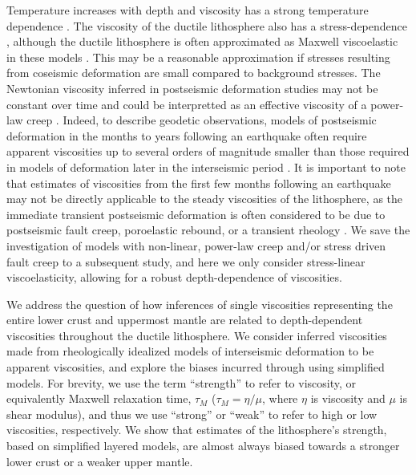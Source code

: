 Temperature increases with depth and viscosity has a strong
temperature dependence \citep[e.g.,][]{Kohlstedt1995}.  The viscosity
of the ductile lithosphere also has a stress-dependence
\citep[e.g.,][]{Kohlstedt1995}, although the ductile lithosphere is
often approximated as Maxwell viscoelastic in these models
\citep[e.g.,][]{Hetland2003, Johnson2007, Riva2009, Yamasaki2012a}.
This may be a reasonable approximation if stresses resulting from
coseismic deformation are small compared to background stresses.  The
Newtonian viscosity inferred in postseismic deformation studies may
not be constant over time and could be interpretted as an effective
viscosity of a power-law creep \citep[e.g.,][]{Freed2006b}. Indeed, to
describe geodetic observations, models of postseismic deformation in
the months to years following an earthquake often require apparent
viscosities up to several orders of magnitude smaller than those
required in models of deformation later in the interseismic period
\citep[e.g.,][]{Pollitz2005,Johnson2007,Meade2013}. It is important to
note that estimates of viscosities from the first few months following
an earthquake may not be directly applicable to the steady viscosities
of the lithosphere, as the immediate transient postseismic deformation
is often considered to be due to postseismic fault creep, poroelastic
rebound, or a transient rheology \citep[e.g.,][]{Pollitz2003,
Freed2006b, Hearn2009}. We save the investigation of models with
non-linear, power-law creep and/or stress driven fault creep to a
subsequent study, and here we only consider stress-linear
viscoelasticity, allowing for a robust depth-dependence of
viscosities.

We address the question of how inferences of single viscosities
representing the entire lower crust and uppermost mantle are related
to depth-dependent viscosities throughout the ductile lithosphere. We
consider inferred viscosities made from rheologically idealized models
of interseismic deformation to be apparent viscosities, and explore
the biases incurred through using simplified models. For brevity, we
use the term ``strength'' to refer to viscosity, or equivalently
Maxwell relaxation time, $\tau_M$ ($\tau_M = \eta/\mu$, where $\eta$
is viscosity and $\mu$ is shear modulus), and thus we use ``strong''
or ``weak'' to refer to high or low viscosities, respectively. We show
that estimates of the lithosphere's strength, based on simplified
layered models, are almost always biased towards a stronger lower
crust or a weaker upper mantle.

